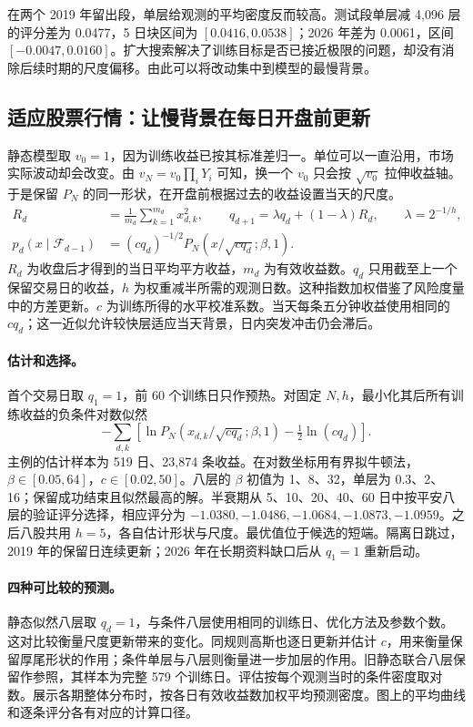 \documentclass[11pt,a4paper]{article}
\begin{document}
在两个 2019 年留出段，单层给观测的平均密度反而较高。测试段单层减 4,096 层的评分差为 0.0477，5 日块区间为 $[0.0416,0.0538]$；2026 年差为 0.0061，区间 $[-0.0047,0.0160]$。扩大搜索解决了训练目标是否已接近极限的问题，却没有消除后续时期的尺度偏移。由此可以将改动集中到模型的最慢背景。

\clearpage
\subsection{适应股票行情：让慢背景在每日开盘前更新}
静态模型取 $v_0=1$，因为训练收益已按其标准差归一。单位可以一直沿用，市场实际波动却会改变。由 $v_N=v_0\prod_iY_i$ 可知，换一个 $v_0$ 只会按 $\sqrt{v_0}$ 拉伸收益轴。于是保留 $P_N$ 的同一形状，在开盘前根据过去的收益设置当天的尺度。
\begin{align}
 R_d&=\frac1{m_d}\sum_{k=1}^{m_d}x_{d,k}^2,\qquad
 q_{d+1}=\lambda q_d+(1-\lambda)R_d,\qquad \lambda=2^{-1/h},\label{eq:update}\\
 p_d(x\mid\mathcal F_{d-1})&=(c q_d)^{-1/2}
 P_N\!\left(x/\sqrt{c q_d};\beta,1\right).\label{eq:cond}
\end{align}
$R_d$ 为收盘后才得到的当日平均平方收益，$m_d$ 为有效收益数。$q_d$ 只用截至上一个保留交易日的收益，$h$ 为权重减半所需的观测日数。这种指数加权借鉴了风险度量中的方差更新\cite{riskmetrics1996}。$c$ 为训练所得的水平校准系数。当天每条五分钟收益使用相同的 $c q_d$；这一近似允许较快层适应当天背景，日内突发冲击仍会滞后。

\paragraph{估计和选择。}
首个交易日取 $q_1=1$，前 60 个训练日只作预热。对固定 $N,h$，最小化其后所有训练收益的负条件对数似然
\[
 -\sum_{d,k}\!\left[\ln P_N\!\left(x_{d,k}/\sqrt{c q_d};\beta,1\right)
 -\tfrac12\ln(c q_d)\right].
\]
主例的估计样本为 519 日、23,874 条收益。在对数坐标用有界拟牛顿法，$\beta\in[0.05,64]$，$c\in[0.02,50]$。八层的 $\beta$ 初值为 1、8、32，单层为 0.3、2、16；保留成功结束且似然最高的解。半衰期从 5、10、20、40、60 日中按平安八层的验证评分选择，相应评分为 $-1.0380,-1.0486,-1.0684,-1.0873,-1.0959$。之后八股共用 $h=5$，各自估计形状与尺度。最优值位于候选的短端。隔离日跳过，2019 年的保留日连续更新；2026 年在长期资料缺口后从 $q_1=1$ 重新启动。

\paragraph{四种可比较的预测。}
静态似然八层取 $q_d=1$，与条件八层使用相同的训练日、优化方法及参数个数。这对比较衡量尺度更新带来的变化。同规则高斯也逐日更新并估计 $c$，用来衡量保留厚尾形状的作用；条件单层与八层则衡量进一步加层的作用。旧静态联合八层保留作参照，其样本为完整 579 个训练日。评估按每个观测当时的条件密度取对数\cite{gneiting2007}。展示各期整体分布时，按各日有效收益数加权平均预测密度。图上的平均曲线和逐条评分各有对应的计算口径。
\end{document}

